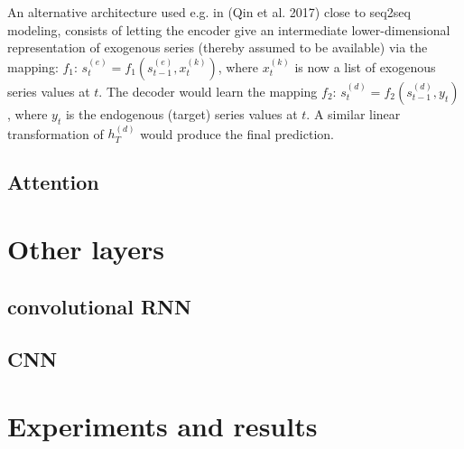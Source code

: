 \documentclass{article}
\begin{document}
An alternative architecture used e.g. in (Qin et al. 2017) close to seq2seq modeling, consists of letting the encoder give an intermediate lower-dimensional representation of exogenous series (thereby assumed to be available) via the mapping: $f_1$: $s^{(e)}_t=f_1(s^{(e)}_{t-1}, x^{(k)}_t)$, where $x^{(k)}_t$ is now a list of exogenous series values at $t$. The decoder would learn the mapping $f_2$: $s^{(d)}_t=f_2(s^{(d)}_{t-1}, y_t)$, where $y_t$ is the endogenous (target) series values at $t$. A similar linear transformation of $h^{(d)}_T$ would produce the final prediction.



\subsection{Attention}
\label{attention}

\section{Other layers}

\subsection{convolutional RNN}

\subsection{CNN}

\section{Experiments and results}
\end{document}
